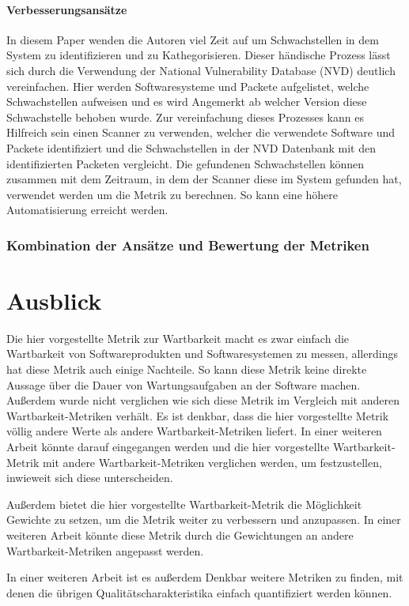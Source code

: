 \documentclass[12pt, a4paper, ngerman]{article}
\begin{document}
\paragraph{Verbesserungsansätze}
In diesem Paper wenden die Autoren viel Zeit auf um Schwachstellen in dem System zu identifizieren und zu Kathegorisieren.
Dieser händische Prozess lässt sich durch die Verwendung der National Vulnerability Database (NVD) deutlich vereinfachen.
Hier werden Softwaresysteme und Packete aufgelistet, welche Schwachstellen aufweisen und 
es wird Angemerkt ab welcher Version diese Schwachstelle behoben wurde.
Zur vereinfachung dieses Prozesses kann es Hilfreich sein einen Scanner zu verwenden, 
welcher die verwendete Software und Packete identifiziert und 
die Schwachstellen in der NVD Datenbank mit den identifizierten Packeten vergleicht.
Die gefundenen Schwachstellen können zusammen mit dem Zeitraum, 
in dem der Scanner diese im System gefunden hat, verwendet werden um die Metrik zu berechnen.
So kann eine höhere Automatisierung erreicht werden.

\subsubsection{Kombination der Ansätze und Bewertung der Metriken}


\section{Ausblick}

Die hier vorgestellte Metrik zur Wartbarkeit macht es zwar einfach
die Wartbarkeit von Softwareprodukten und Softwaresystemen
zu messen, allerdings hat diese Metrik auch einige Nachteile.
So kann diese Metrik keine direkte Aussage über die Dauer 
von Wartungsaufgaben an der Software machen.
Außerdem wurde nicht verglichen wie sich diese Metrik 
im Vergleich mit anderen Wartbarkeit-Metriken verhält.
Es ist denkbar, dass die hier vorgestellte Metrik
völlig andere Werte als andere Wartbarkeit-Metriken liefert.
In einer weiteren Arbeit könnte darauf eingegangen werden
und die hier vorgestellte Wartbarkeit-Metrik
mit andere Wartbarkeit-Metriken verglichen werden,
um festzustellen, inwieweit sich diese unterscheiden.

Außerdem bietet die hier vorgestellte Wartbarkeit-Metrik 
die Möglichkeit Gewichte zu setzen, 
um die Metrik weiter zu verbessern und anzupassen.
In einer weiteren Arbeit könnte diese Metrik durch
die Gewichtungen an andere Wartbarkeit-Metriken angepasst werden.

In einer weiteren Arbeit ist es außerdem Denkbar weitere Metriken zu finden,
mit denen die übrigen Qualitätscharakteristika 
einfach quantifiziert werden können.



\newpage
\printbibliography
\end{document}
